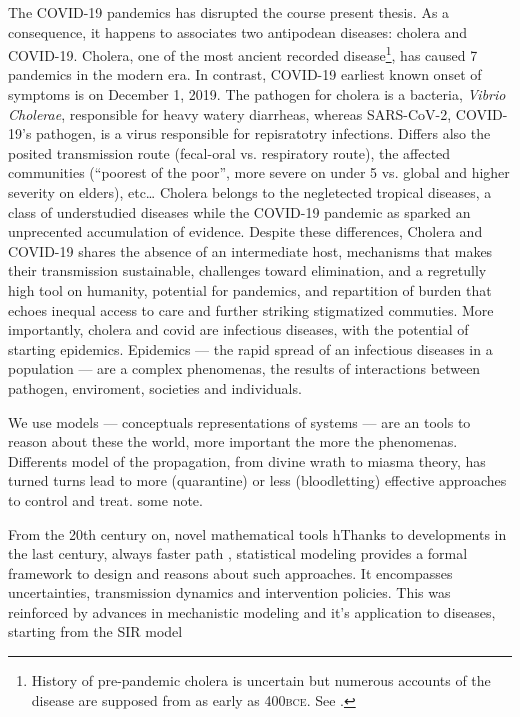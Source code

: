 The COVID-19 pandemics has disrupted the course present thesis. As a consequence, it happens to associates two antipodean diseases: cholera and COVID-19.
Cholera, one of the most ancient recorded disease\footnote{History of pre-pandemic cholera is uncertain but numerous accounts of the disease are supposed from as early as 400\textsc{bce}. See .}, has caused 7 pandemics in the modern era. In contrast, COVID-19 earliest known onset of symptoms is on December 1, 2019. The pathogen for cholera is a bacteria, \textit{Vibrio Cholerae}, responsible for heavy watery diarrheas, whereas SARS-CoV-2, COVID-19’s pathogen, is a virus responsible for repisratotry infections. Differs also the posited transmission route (fecal-oral vs. respiratory route), the affected communities (``poorest of the poor”, more severe on under 5 vs. global and higher severity on elders), etc… Cholera belongs to the negletected tropical diseases, a class of understudied diseases while the COVID-19 pandemic as sparked an unprecented accumulation of evidence\cite{COVID-19OpenAccessProject:LivingEvidenceCOVID19:2020}. Despite these differences, Cholera and COVID-19 shares the absence of an intermediate host, mechanisms that makes their transmission sustainable, challenges toward elimination, and a regretully high tool on humanity, potential for pandemics, and repartition of burden that echoes inequal access to care and further striking stigmatized commuties. More importantly, cholera and covid are infectious diseases, with the potential of starting epidemics. Epidemics — the rapid spread of an infectious diseases in a population —  are a complex phenomenas, the results of interactions between pathogen, enviroment, societies and individuals.

We use models — conceptuals representations of systems — are an  tools to reason about these the world, more important the more the phenomenas. Differents model of the propagation, from divine wrath to miasma theory, has turned turns lead to more (quarantine) or less (bloodletting) effective approaches to control and treat. some note.

From the 20th century on, novel mathematical tools\cite{Freedman:AssociationCausationRemarks:1999} hThanks to  developments in the last century, always faster path \cite{Gelman:WhatAreMost:2021} , statistical modeling provides a formal framework to design and reasons about such approaches. It encompasses uncertainties, transmission dynamics and intervention policies. This was reinforced by advances in mechanistic modeling and it's application to diseases, starting from the SIR model\cite{Kermack:ContributionMathematicalTheory:1927}

